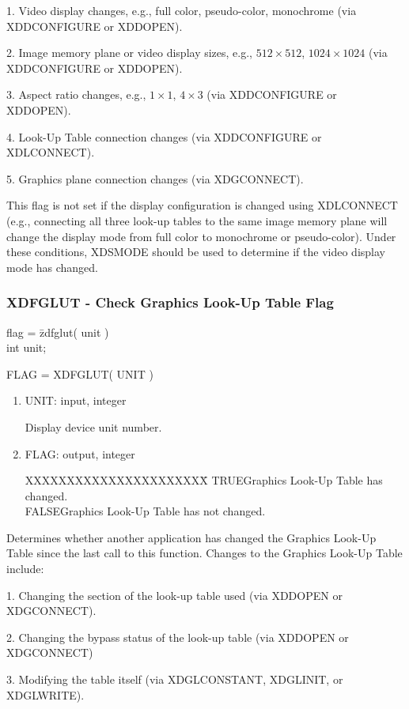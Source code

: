 1.  Video display changes, e.g., full color, pseudo-color,
monochrome (via XDDCONFIGURE or XDDOPEN).

2.  Image memory plane or video display sizes, e.g., $512 \times 512$,
$1024 \times 1024$ (via XDDCONFIGURE or XDDOPEN).

3.  Aspect ratio changes, e.g., $1 \times 1$, $4 \times 3$ (via XDDCONFIGURE
or XDDOPEN).

4.  Look-Up Table connection changes (via XDDCONFIGURE or XDLCONNECT).

5.  Graphics plane connection changes (via XDGCONNECT).

This flag is not set if the display configuration is changed using XDLCONNECT
(e.g., connecting all three look-up tables to the same image memory plane
will change the display mode from full color to monochrome or pseudo-color).
Under these conditions, XDSMODE should be used to determine if the video display
mode has changed.
\newpage
\subsubsection{XDFGLUT - Check Graphics Look-Up Table Flag}
\begin{tabbing}
flag = \=zdfglut( unit )\\
\>int  unit;\\
\end{tabbing}
FLAG = XDFGLUT( UNIT )
\begin{enumerate}
\item UNIT:  input, integer

Display device unit number.
\item FLAG:  output, integer
\begin{tabbing}
XXXXXXXXXXXXXXXXXXXXXX\=\kill
TRUE\>Graphics Look-Up Table has changed.\\
FALSE\>Graphics Look-Up Table has not changed.\\
\end{tabbing}
\end{enumerate}
Determines whether another application has changed the Graphics Look-Up
Table since the last call to this function.  Changes to the Graphics Look-Up
Table include:

1.  Changing the section of the look-up table used (via XDDOPEN or XDGCONNECT).

2.  Changing the bypass status of the look-up table (via XDDOPEN or XDGCONNECT)

3.  Modifying the table itself (via XDGLCONSTANT, XDGLINIT, or XDGLWRITE).
\newpage
